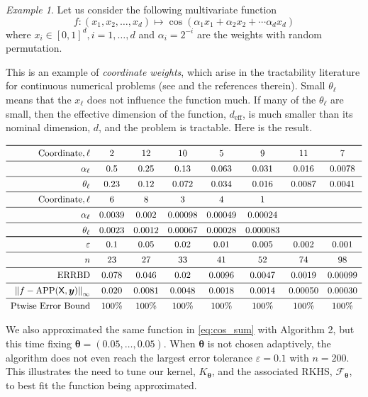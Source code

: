 \documentclass[]{mcom-l}
\theoremstyle{theorem}
\theoremstyle{remark}
\newtheorem{example}{Example}
\DeclareMathOperator{\errBd}{ERRBD}
\DeclareMathOperator{\APP}{APP}
\newcommand{\mX}{\mathsf{X}}
\newcommand{\by}{{\boldsymbol{y}}}
\newcommand{\btheta}{{\boldsymbol{\theta}}}
\newcommand{\calf}{{\mathcal{F}}}
\newcommand{\norm}[2][{}]{\ensuremath{\left \lVert #2 \right \rVert}_{#1}}
\begin{document}
\begin{example}
\label{ex:ChengDufun}
Let us consider the following multivariate function
	\begin{equation}\label{eq:cos_sum}
	f:(x_1,x_2,\ldots,x_d) \mapsto 
 \cos(\alpha_1 x_1 + \alpha_2 x_2 +
 \cdots \alpha_d x_d)
	\end{equation}
	where $x_i \in [0,1]^d, i=1,\ldots,d$ and $\alpha_i =2^{-i}$ are the weights with random permutation. 
	
This is an example of \emph{coordinate weights}, which arise in the tractability literature for continuous numerical problems (see \cite{DicEtal14a,NovWoz08a, NovWoz10a, NovWoz12a} and the references therein).  Small $\theta_\ell$ means that the $x_\ell$ does not influence the function much.  If many of the $\theta_\ell$ are small, then the effective dimension of the function, $d_\text{eff}$, is much smaller than its nominal dimension, $d$, and the problem is tractable. Here is the result.
 
\begin{table}

\[ 
 \begin{array}{rccccccc} 
\toprule
\text{Coordinate}, \ell & 2 & 12 & 10 & 5 & 9 & 11 & 7 \\ \midrule 
\alpha_\ell & 0.5  & 0.25  & 0.13  & 0.063  & 0.031  & 0.016  & 0.0078  \\ \midrule 
\theta_\ell & 0.23  & 0.12  & 0.072  & 0.034  & 0.016  & 0.0087  & 0.0041  \\ \midrule 
\text{Coordinate}, \ell & 6  & 8  & 3  & 4  & 1  \\ \midrule 
\alpha_\ell & 0.0039  & 0.002  & 0.00098  & 0.00049  & 0.00024  \\ \midrule 
\theta_\ell & 0.0023  & 0.0012  & 0.00067  & 0.00028  & 0.000083   \\ \toprule 
\varepsilon & 0.1 & 0.05 & 0.02 & 0.01 & 0.005 & 0.002 & 0.001 \\ \midrule 
n &  23 &  27 &  33 &  41 &  52 &  74 &  98 \\ \midrule 
\errBd  & 0.078 & 0.046 & 0.02 & 0.0096 & 0.0047 & 0.0019 & 0.00099 \\ \midrule 
\norm[\infty]{f - \APP(\mX,\by)} & 0.020 & 0.0081 & 0.0048 & 0.0018 & 0.0014 & 0.00050 & 0.00030  \\ \midrule 
\text{Ptwise Error Bound} & 100\% & 100\% & 100\% & 100\% & 100\% & 100\% & 100\% 
\end{array} 
 \]
\end{table}

We also approximated the same function in \eqref{eq:cos_sum} with Algorithm 2, but this time fixing $\btheta = (0.05, \ldots, 0.05)$. When $\btheta$ is not chosen adaptively, the algorithm does not even reach the largest error tolerance $\varepsilon = 0.1$ with $n = 200$. This illustrates the need to tune our kernel, $K_\btheta$, and the associated RKHS, $\calf_\btheta$, to best fit the function being approximated.

\end{example}
\end{document}

